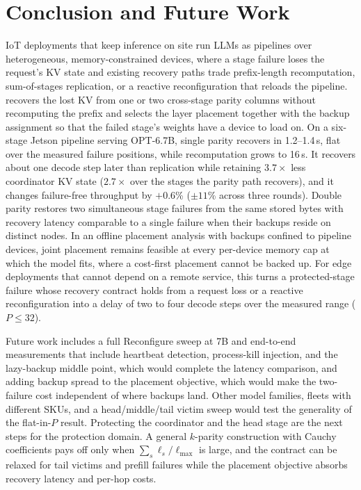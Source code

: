 \section{Conclusion and Future Work}\label{sec:disc}

IoT deployments that keep inference on site run LLMs as pipelines over
heterogeneous, memory-constrained devices, where a stage failure loses the
request's KV state and existing recovery paths trade prefix-length
recomputation, sum-of-stages replication, or a reactive reconfiguration that
reloads the pipeline.
\sys{} recovers the lost KV from one or two cross-stage parity columns
without recomputing the prefix and selects the layer placement together with
the backup assignment so that the failed stage's weights have a device to
load on.
On a six-stage Jetson pipeline serving OPT-6.7B, single parity recovers in
1.2--1.4\,s, flat over the measured failure positions, while recomputation
grows to 16\,s.  It recovers about one decode step later than replication
while retaining $3.7\times$ less coordinator KV state ($2.7\times$ over
the stages the parity path recovers), and it changes failure-free throughput
by $+0.6$\% ($\pm11$\% across three rounds).  Double parity restores two
simultaneous stage failures from the same stored bytes with recovery
latency comparable to a single failure when their backups reside on
distinct nodes.  In an offline placement analysis
with backups confined to pipeline devices, joint placement remains feasible at every
per-device memory cap at which the model fits, where a cost-first placement
cannot be backed up.  For edge deployments that cannot depend on a remote
service, this turns a protected-stage failure whose recovery contract holds
from a request loss or a reactive reconfiguration into a delay of two to
four decode steps over the measured range ($P\le32$).

Future work includes a full Reconfigure sweep at 7B and end-to-end
measurements that include heartbeat detection, process-kill injection, and
the lazy-backup middle point, which would complete the latency comparison,
and adding backup spread to the placement objective, which would make the
two-failure cost independent of where backups land.  Other model families, fleets with
different SKUs, and a head/middle/tail victim sweep would test the
generality of the flat-in-$P$ result.  Protecting the coordinator and the
head stage are the next steps for the protection domain.  A general
$k$-parity construction with Cauchy coefficients pays off only when
$\sum_s\ell_s/\ell_{\max}$ is large, and the contract can be relaxed for
tail victims and prefill failures while the placement objective absorbs
recovery latency and per-hop costs.
